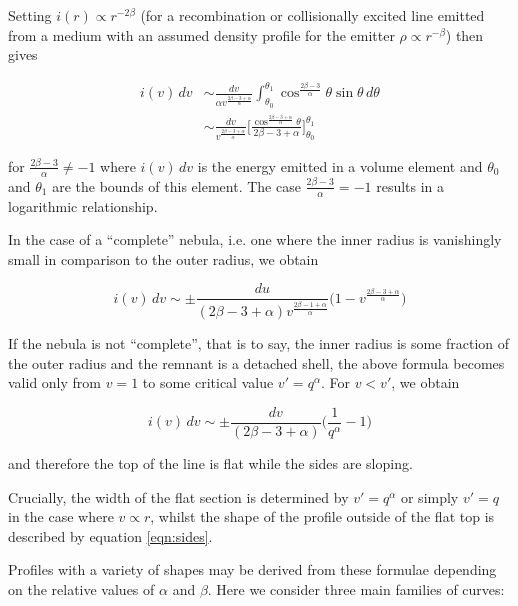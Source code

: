 \documentclass[useAMS,usenatbib,usegraphicx]{mnras}
\begin{document}
Setting $i(r) \propto r^{-2\beta}$ (for a recombination or collisionally excited line emitted from 
a medium with an assumed density profile for the emitter $\rho \propto 
r^{-\beta}$) then gives

\begin{equation}
\begin{split}
i(v) \, dv &\sim \frac{dv}{\alpha v^{\frac{2\beta-3+\alpha}{\alpha}}} \int^{\theta_1}_{\theta_0} \cos^{\frac{2\beta-3}{\alpha}} \theta \sin \theta \, d\theta 
\\
&\sim  \frac{dv}{v^{\frac{2\beta-3+\alpha}{\alpha}}} \Bigg[\frac{\cos^{\frac{2\beta - 3 + \alpha}{\alpha}} \theta}{2\beta -3 + \alpha}\Bigg]^{\theta_1}_{\theta_0}
\end{split}
\end{equation}

\noindent for $\frac{2\beta-3}{\alpha} \neq -1$ where $i(v) \,dv$ is the energy emitted in a volume element and $\theta_0$ and $\theta_1$ are the bounds of this element.  The case 
$\frac{2\beta-3}{\alpha} = -1$ results in a logarithmic relationship.


In the case of a ``complete'' nebula, i.e. one where the inner radius is 
vanishingly small in comparison to the outer radius, we obtain

\begin{equation}
\label{eqn:sides}
	i(v) \, dv \sim \pm \frac{du}{(2\beta-3+\alpha) v^{\frac{2\beta-1+\alpha}{\alpha}}} \Big(1-v^{\frac{2\beta-3+\alpha}{\alpha}} \Big)
\end{equation}

If the nebula is not ``complete'', that is to say, the inner radius is some fraction of the outer radius and the remnant is a detached shell, the above formula becomes valid only from $v=1$ to some critical value $v'=q^\alpha$. For $v<v'$, we obtain

\begin{equation}
i(v) \, dv \sim \pm \frac{dv}{(2\beta-3+\alpha)} \Big( \frac{1}{q^\alpha} - 1 \Big)
\end{equation}

\noindent and therefore the top of the line is flat while the sides are 
sloping.

Crucially, the width of the flat section is determined by $v'=q^\alpha$ or 
simply $v'=q$ in the case where $v \propto r$, whilst the shape of the 
profile outside of the flat top is described by equation \ref{eqn:sides}.

Profiles with a variety of shapes may be derived from these formulae 
depending on the relative values of $\alpha$ and $\beta$.  Here we 
consider three main families of curves:
\end{document}
